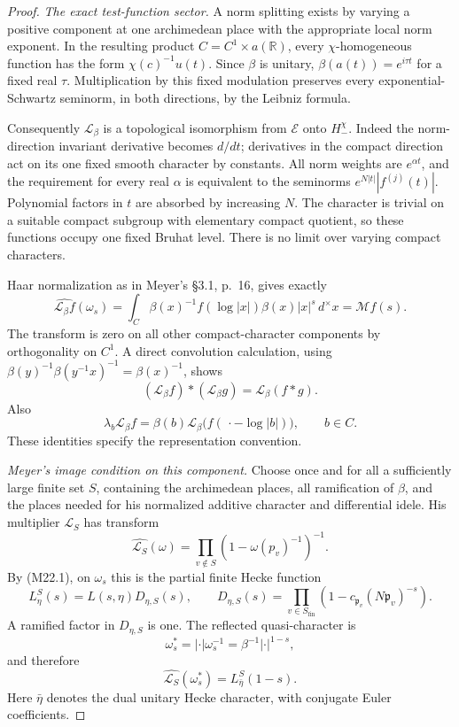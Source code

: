 \documentclass[11pt,a4paper]{article}
\begin{document}
\begin{proof}
\emph{The exact test-function sector.}
A norm splitting exists by varying a positive component
at one archimedean place with the appropriate local
norm exponent.  In the resulting product
\(C=C^1\times a(\mathbb R)\), every \(\chi\)-homogeneous
function has the form \(\chi(c)^{-1}u(t)\).
Since \(\beta\) is unitary,
\(\beta(a(t))=e^{i\tau t}\) for a fixed real \(\tau\).
Multiplication by this fixed modulation preserves
every exponential-Schwartz seminorm, in both
directions, by the Leibniz formula.

Consequently \(\mathcal L_\beta\) is a topological
isomorphism from \(\mathcal E\) onto \(H_-^\chi\).
Indeed the norm-direction invariant derivative becomes
\(d/dt\); derivatives in the compact direction act
on its one fixed smooth character by constants.
All norm weights are \(e^{\alpha t}\), and the
requirement for every real \(\alpha\) is equivalent
to the seminorms \(e^{N|t|}|f^{(j)}(t)|\).
Polynomial factors in \(t\) are absorbed by increasing
\(N\).  The character is trivial on a suitable
compact subgroup with elementary compact quotient,
so these functions occupy one fixed Bruhat level.
There is no limit over varying compact characters.

Haar normalization as in Meyer's \S3.1, p.~16,
gives exactly
\[
 \widehat{\mathcal L_\beta f}(\omega_s)
       =\int_C\beta(x)^{-1}f(\log|x|)
                      \beta(x)|x|^s\,d^\times x
       =\mathcal Mf(s).                                        \tag{M22.3}
\]
The transform is zero on all other compact-character
components by orthogonality on \(C^1\).
A direct convolution calculation, using
\(\beta(y)^{-1}\beta(y^{-1}x)^{-1}=\beta(x)^{-1}\),
shows
\[
  (\mathcal L_\beta f)*(\mathcal L_\beta g)
                         =\mathcal L_\beta(f*g).
\]
Also
\[
 \lambda_b\mathcal L_\beta f
   =\beta(b)\mathcal L_\beta
         \bigl(f(\,\cdot-\log|b|)\bigr),\qquad b\in C.            \tag{M22.4}
\]
These identities specify the representation convention.

\emph{Meyer's image condition on this component.}
Choose once and for all a sufficiently large finite
set \(S\), containing the archimedean places, all
ramification of \(\beta\), and the places needed for
his normalized additive character and differential
idele.  His multiplier \(\mathcal L_S\) has transform
\[
 \widehat{\mathcal L_S}(\omega)
       =\prod_{v\notin S}(1-\omega(p_v)^{-1})^{-1}.
\]
By (M22.1), on \(\omega_s\) this is the partial finite
Hecke function
\[
 L_\eta^S(s)
       =L(s,\eta)D_{\eta,S}(s),\qquad
 D_{\eta,S}(s)=
        \prod_{v\in S_{\mathrm{fin}}}
             (1-c_{\mathfrak p_v}(N\mathfrak p_v)^{-s}).         \tag{M22.5}
\]
A ramified factor in \(D_{\eta,S}\) is one.
The reflected quasi-character is
\[
 \omega_s^*=|\cdot|\omega_s^{-1}
                    =\beta^{-1}|\cdot|^{1-s},
\]
and therefore
\[
              \widehat{\mathcal L_S}(\omega_s^*)
                       =L_{\bar\eta}^S(1-s).                   \tag{M22.6}
\]
Here \(\bar\eta\) denotes the dual unitary Hecke
character, with conjugate Euler coefficients.


\end{proof}
\end{document}
